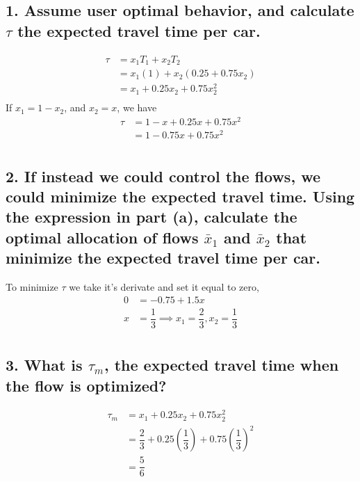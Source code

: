 \documentclass{tufte-handout}
\begin{document}
\subsection{1. Assume user optimal behavior, and calculate $\tau$ the expected travel time per car.}

\begin{align*}
\tau &= x_1 T_1 + x_2 T_2 \\
     &= x_1 (1) + x_2 (0.25 + 0.75 x_2) \\
     &= x_1 + 0.25 x_2 + 0.75 x_2^2 \\
\end{align*}
If $x_1 = 1 - x_2$, and $x_2 = x$, we have
\begin{align*}
\tau &= 1 - x  + 0.25x  + 0.75 x^2 \\
     &= 1 - 0.75x + 0.75 x^2 \\
\end{align*}

\subsection{2. If instead we could control the flows, we could minimize the expected travel time. Using the expression in part (a), calculate the optimal allocation of flows $\bar{x}_1$ and $\bar{x}_2$ that minimize the expected travel time per car.}

To minimize $\tau$ we take it's derivate and set it equal to zero,
\begin{align*}
0 &= - 0.75 + 1.5 x \\
x &= \dfrac{1}{3} \implies x_1 = \dfrac{2}{3}, x_2 = \dfrac{1}{3}\\
\end{align*}

\subsection{3. What is $\tau_m$, the expected travel time when the flow is optimized?}

\begin{align*}
\tau_m &= x_1 + 0.25 x_2 + 0.75 x_2^2 \\
&= \dfrac{2}{3} + 0.25 \left( \dfrac{1}{3} \right) + 0.75 \left( \dfrac{1}{3} \right)^2 \\
&= \dfrac{5}{6}
\end{align*}
\end{document}
